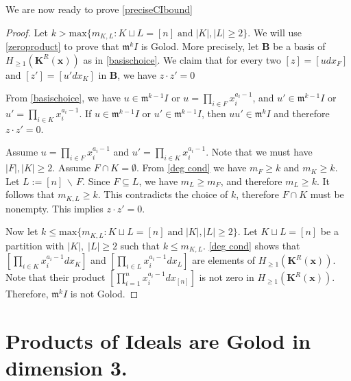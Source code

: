 \documentclass[10pt,reqno]{amsart}
\newtheorem{proposition}[subsection]{Proposition}
\theoremstyle{definition}
\theoremstyle{remark}
\numberwithin{equation}{section}
\newcommand{\kk}{\mathsf k}
\newcommand{\m}{\mathfrak m}
\numberwithin{equation}{section}
\begin{document}
We are now ready to prove \cref{preciseCIbound}
\begin{proof} 
Let $k>\mathrm{max}\{m_{K, L}: K\sqcup L= [n]\;\text{and}\;|K|,|L|\geq 2 \}$. We will use \cref{zeroproduct} to prove that $\m^kI$ is Golod.
More precisely, let $\mathbf{B}$ be a basis of $H_{\geq 1}(\mathbf{K}^R(\mathbf{x}))$ as in \cref{basischoice}. 
We claim that for every two $[z]=[udx_F]$ and $[z']=[u'dx_K]$ in $\mathbf B$, we have 
$z\cdot z'=0$

From \cref{basischoice}, we have $u\in \m^{k-1}I$ or $u=\prod_{i\in F} x_i^{a_i-1}$, and   $u'\in \m^{k-1}I$ or $u'=\prod_{i\in K} x_i^{a_i-1}$.
If $u\in \m^{k-1}I$ or $u'\in \m^{k-1}I$, then $uu'\in \m^kI$ and therefore $z\cdot z'=0$. 

Assume $u=\prod_{i\in F} x_i^{a_i-1}$ and $u'=\prod_{i\in K} x_i^{a_i-1}$. Note that we must have $|F|, |K|\ge 2$. 
Assume $F\cap K=\emptyset$.
From \cref{deg cond} we have $m_F\ge k$ and $m_K\ge k$.
Let $L:=[n]\, \backslash\,  F$. Since $F\subseteq L$, we have $m_L\ge m_F$, and therefore $m_L\ge k$.
It follows that $m_{K, L} \ge k$. This contradicts the choice of $k$, therefore $F\cap K$ must be nonempty. This implies $z\cdot z'=0$.



Now let $k\le \mathrm{max}\{m_{K, L}: K\sqcup L= [n]\;\text{and}\;|K|,|L|\geq 2 \}$. 
Let $K\sqcup L =[n]$ be a partition with $|K|,\;|L|\geq 2$ such that $k\leq m_{K,L}$. \cref{deg cond} shows that $ \left[\prod_{i\in K} x_i^{a_i-1}dx_{K}\right]$ and $\left[\prod_{i\in L} x_i^{a_i-1}dx_{L}\right]$ are elements of $H_{\geq 1}(\mathbf{K}^R(\mathbf{x})) $. Note that their product $\left[\prod_{i=1}^n x_i^{a_i-1}dx_{[n]}\right]$ is not zero in $H_{\geq 1}(\mathbf{K}^R(\mathbf{x}))$. Therefore, $ \m^kI$ is not Golod. 
\end{proof}  


\section{Products of Ideals are Golod in dimension 3.}
\end{document}
